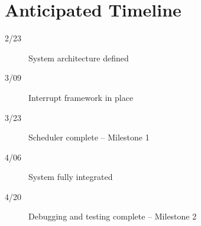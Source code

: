 \documentclass[twocolumn]{article}
\begin{document}
\section*{Anticipated Timeline}
\begin{description}
\item[2/23] System architecture defined
\item[3/09] Interrupt framework in place
\item[3/23] Scheduler complete -- Milestone 1
\item[4/06] System fully integrated
\item[4/20] Debugging and testing complete -- Milestone 2
\end{description}


\nocite{*}
{\small
	
	
}
\end{document}
